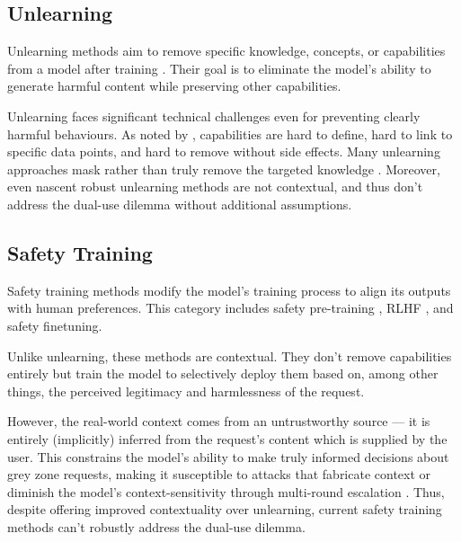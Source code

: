 \documentclass{article}
\theoremstyle{plain}
\theoremstyle{definition}
\theoremstyle{remark}
\begin{document}
\subsection{Unlearning}

Unlearning methods aim to remove specific knowledge, concepts, or
capabilities from a model after training
\cite{liu2024rethinkingmachineunlearninglarge}. Their goal is to
eliminate the model's ability to generate harmful content while
preserving other capabilities.

Unlearning faces significant technical challenges even for preventing
clearly harmful behaviours. As noted by
\citet{barez2025openproblemsmachineunlearning}, capabilities are hard
to define, hard to link to specific data points, and hard to remove
without side effects. Many unlearning approaches mask rather than
truly remove the targeted knowledge
\cite{deeb2025unlearningmethodsremoveinformation}. Moreover, even
nascent robust unlearning methods
\cite{cloud2024gradientroutingmaskinggradients} are not contextual,
and thus don't address the dual-use dilemma without additional assumptions.

\subsection{Safety Training}

Safety training methods modify the model's training process to align
its outputs with human preferences. This category includes safety
pre-training \cite{maini2025safetypretraininggenerationsafe}, RLHF
\cite{christiano2023deepreinforcementlearninghuman}, and safety finetuning.

Unlike unlearning, these methods are contextual. They don't remove
capabilities entirely but train the model to selectively deploy them
based on, among other things, the perceived legitimacy and
harmlessness of the request.

However, the real-world context comes from an untrustworthy source
--- it is entirely (implicitly) inferred from the request's content
which is supplied by the user. This constrains the model's ability to
make truly informed decisions about grey zone requests, making it
susceptible to attacks that fabricate context
\cite{zeng2024johnnypersuadellmsjailbreak} or diminish the model's
context-sensitivity through multi-round escalation
\cite{russinovich2025greatwritearticlethat}.
Thus, despite offering improved contextuality over unlearning,
current safety training methods can't robustly address the dual-use dilemma.
\end{document}
